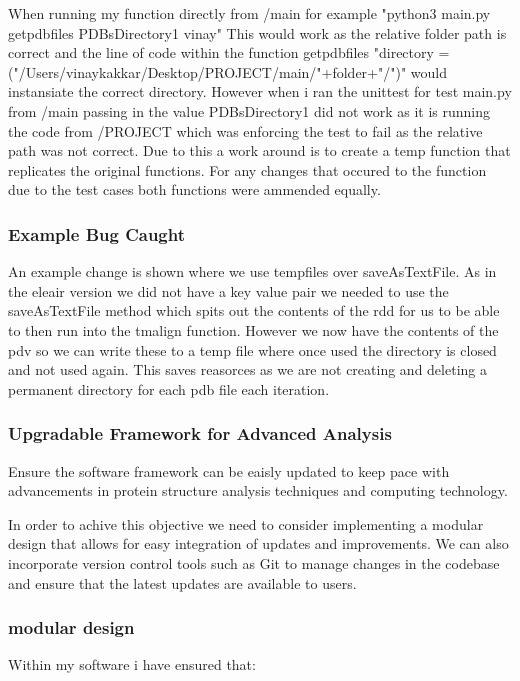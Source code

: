 \documentclass[]{final_report}
\begin{document}
When running my function directly from /main for example "python3 main.py getpdbfiles PDBsDirectory1 vinay" This would work as the relative folder path is correct and the line of code within the function getpdbfiles "directory = ("/Users/vinaykakkar/Desktop/PROJECT/main/"+folder+"/")" would instansiate the correct directory. However when i ran the unittest for test main.py from /main passing in the value PDBsDirectory1 did not work as it is running the code from /PROJECT which was enforcing the test to fail as the relative path was not correct. Due to this a work around is to create a temp function that replicates the original functions. For any changes that occured to the function due to the test cases both functions were ammended equally.

\subsubsection{Example Bug Caught}

An example change is shown where we use tempfiles over saveAsTextFile. As in the eleair version we did not have a key value pair we needed to use the saveAsTextFile method which spits out the contents of the rdd for us to be able to then run into the tmalign function. However we now have the contents of the pdv so we can write these to a temp file where once used the directory is closed and not used again. This saves reasorces as we are not creating and deleting a permanent directory for each pdb file each iteration.

\clearpage

\subsubsection{Upgradable Framework for Advanced Analysis}
\begin{displayquote}
    Ensure the software framework can be eaisly updated to keep pace with advancements
    in protein structure analysis techniques and computing technology.
\end{displayquote}

In order to achive this objective we need to consider implementing a modular design that allows for easy integration of updates and improvements. We can also incorporate version control tools such as Git to manage changes in the codebase and ensure that the latest updates are available to users.

\subsubsection{modular design}
Within my software i have ensured that:
\end{document}
